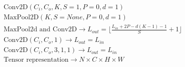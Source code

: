 \documentclass[10pt, etterpaper]{article}
\begin{document}
\begin{align}
&\mathrm{Conv2D}(C_i, C_o, K, S=1, P=0, d=1) \\
&\mathrm{MaxPool2D}(K,S=None,P=0,d=1) \\
&\textrm{MaxPool2d and Conv2D}  \to L_{out} =  \lfloor  \frac{L_{in}+2P-d(K-1)-1}{S}+1\rfloor \\
&\mathrm{Conv2D}(C_i, C_o,1) \to L_{out} = L_{in} \\
&\mathrm{Conv2D}(C_i, C_o,3,1,1) \to L_{out} = L_{in} \\
&\textrm{Tensor representation} \to N \times C \times H \times W
\end{align}
\end{document}
